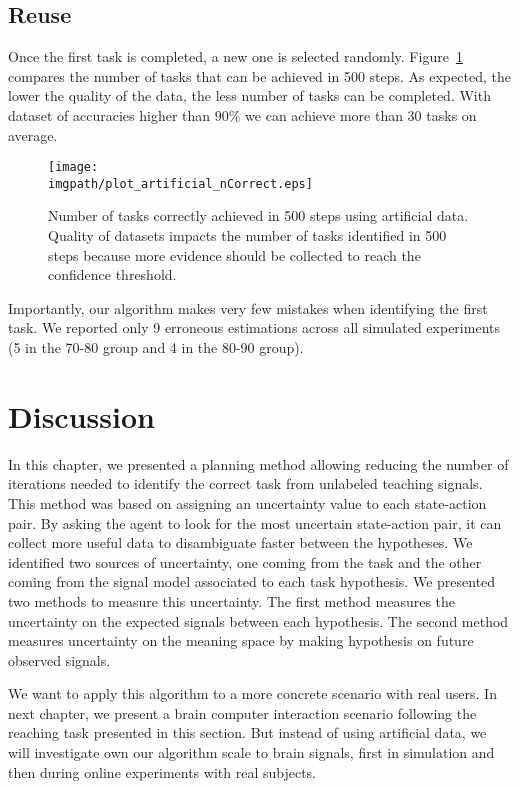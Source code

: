 \subsection{Reuse}

Once the first task is completed, a new one is selected randomly. Figure~\ref{fig:nCorrectArtificial} compares the number of tasks that can be achieved in 500 steps. As expected, the lower the quality of the data, the less number of tasks can be completed. With dataset of accuracies higher than $90\%$ we can achieve more than 30 tasks on average.

\begin{figure}[!htbp]
    \centering
    \texttt{[image: \\imgpath/plot\_artificial\_nCorrect.eps]}
    \caption{Number of tasks correctly achieved in 500 steps using artificial data. Quality of datasets impacts the number of tasks identified in 500 steps because more evidence should be collected to reach the confidence threshold.}
    \label{fig:nCorrectArtificial}
\end{figure} 

Importantly, our algorithm makes very few mistakes when identifying the first task. We reported only 9 erroneous estimations across all simulated experiments (5 in the 70-80 group and 4 in the 80-90 group).

\section{Discussion}

In this chapter, we presented a planning method allowing reducing the number of iterations needed to identify the correct task from unlabeled teaching signals. This method was based on assigning an uncertainty value to each state-action pair. By asking the agent to look for the most uncertain state-action pair, it can collect more useful data to disambiguate faster between the hypotheses. We identified two sources of uncertainty, one coming from the task and the other coming from the signal model associated to each task hypothesis. We presented two methods to measure this uncertainty. The first method measures the uncertainty on the expected signals between each hypothesis. The second method measures uncertainty on the meaning space by making hypothesis on future observed signals.

We want to apply this algorithm to a more concrete scenario with real users. In next chapter, we present a brain computer interaction scenario following the reaching task presented in this section. But instead of using artificial data, we will investigate own our algorithm scale to brain signals, first in simulation and then during online experiments with real subjects.


